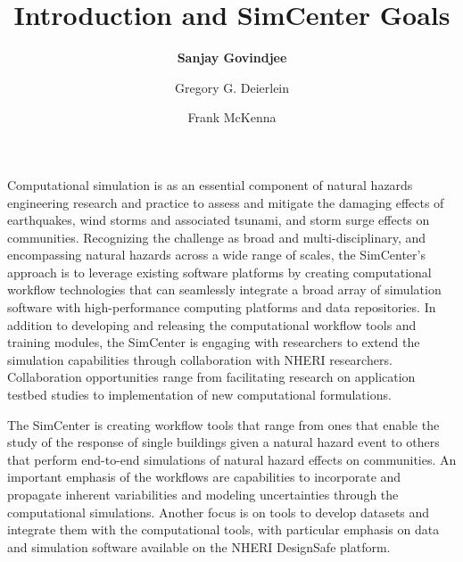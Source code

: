 %
%
%

\title{Introduction and SimCenter Goals}
\author{
    \textbf{Sanjay Govindjee}
    \and Gregory G. Deierlein
    \and Frank McKenna}
\tocauthor{}
%
%
\maketitle

Computational simulation is as an essential component of natural hazards engineering research and practice to assess and mitigate the damaging effects of earthquakes, wind storms and associated tsunami, and storm surge effects on communities. Recognizing the challenge as broad and multi-disciplinary, and encompassing natural hazards across a wide range of scales, the SimCenter’s approach is to leverage existing software platforms by creating computational workflow technologies that can seamlessly integrate a broad array of simulation software with high-performance computing platforms and data repositories. In addition to developing and releasing the computational workflow tools and training modules, the SimCenter is engaging with researchers to extend the simulation capabilities through collaboration with NHERI researchers. Collaboration opportunities range from facilitating research on application testbed studies to implementation of new computational formulations.

The SimCenter is creating workflow tools that range from ones that enable the study of the response of single buildings given a natural hazard event to others that perform end-to-end simulations of natural hazard effects on communities. An important emphasis of the workflows are capabilities to incorporate and propagate inherent variabilities and modeling uncertainties through the computational simulations. Another focus is on tools to develop datasets and integrate them with the computational tools, with particular emphasis on data and simulation software available on the NHERI DesignSafe platform.


